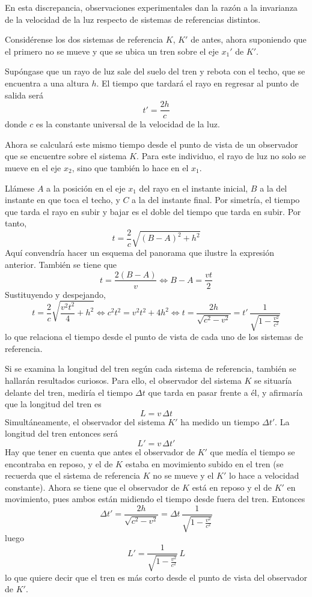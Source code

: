\documentclass[12pt]{report}
\begin{document}
\vspace{2mm}
En esta discrepancia, observaciones experimentales dan la razón a la invarianza de la velocidad de la luz respecto de sistemas de referencias distintos.

\begin{example}
Considérense los dos sistemas de referencia $K$, $K'$ de antes, ahora suponiendo que el primero no se mueve y que se ubica un tren sobre el eje $x_1'$ de $K'$. 

\vspace{2mm}
\noindent Supóngase que un rayo de luz sale del suelo del tren y rebota con el techo, que se encuentra a una altura $h$. El tiempo que tardará el rayo en regresar al punto de salida será
\[t' = \frac{2h}{c}\]
donde $c$ es la constante universal de la velocidad de la luz. 

\vspace{2mm}
\noindent Ahora se calculará este mismo tiempo desde el punto de vista de un observador que se encuentre sobre el sistema $K$. Para este individuo, el rayo de luz no solo se mueve en el eje $x_2$, sino que también lo hace en el $x_1$. 

\vspace{2mm}
\noindent Llámese $A$ a la posición en el eje $x_1$ del rayo en el instante inicial, $B$ a la del instante en que toca el techo, y $C$ a la del instante final. Por simetría, el tiempo que tarda el rayo en subir y bajar es el doble del tiempo que tarda en subir. Por tanto,
\[t = \frac{2}{c}\sqrt{(B-A)^2+h^2}\]
 Aquí convendría hacer un esquema del panorama que ilustre la expresión anterior. También se tiene que
\[t = \frac{2(B-A)}{v} \iff B-A = \frac{vt}{2}\]
Sustituyendo y despejando,
\[t = \frac{2}{c}\sqrt{\frac{v^2t^2}{4}+h^2} \iff  c^2t^2 = v^2t^2+4h^2 \iff t = \frac{2h}{\sqrt{c^2-v^2}} = t' \, \frac{1}{\sqrt{1-\frac{v^2}{c^2}}}\]
lo que relaciona el tiempo desde el punto de vista de cada uno de los sistemas de referencia. 

\vspace{2mm}
\noindent Si se examina la longitud del tren según cada sistema de referencia, también se hallarán resultados curiosos. Para ello, el observador del sistema $K$ se situaría delante del tren, mediría el tiempo $\Delta t$ que tarda en pasar frente a él, y afirmaría que la longitud del tren es
\[L = v \, \Delta t\]
Simultáneamente, el observador del sistema $K'$ ha medido un tiempo $\Delta t'$. La longitud del tren entonces será
\[L' = v \, \Delta t'\]
Hay que tener en cuenta que antes el observador de $K'$ que medía el tiempo se encontraba en reposo, y el de $K$ estaba en movimiento subido en el tren (se recuerda que el sistema de referencia $K$ no se mueve y el $K'$ lo hace a velocidad constante). Ahora se tiene que el observador de $K$ está en reposo y el de $K'$ en movimiento, pues ambos están midiendo el tiempo desde fuera del tren. Entonces
\[\Delta t' = \frac{2h}{\sqrt{c^2-v^2}} = \Delta t \, \frac{1}{\sqrt{1-\frac{v^2}{c^2}}}\]
luego
\[L' = \frac{1}{\sqrt{1-\frac{v^2}{c^2}}} \, L\]
lo que quiere decir que el tren es más corto desde el punto de vista del observador de $K'$.
\end{example}
\end{document}
